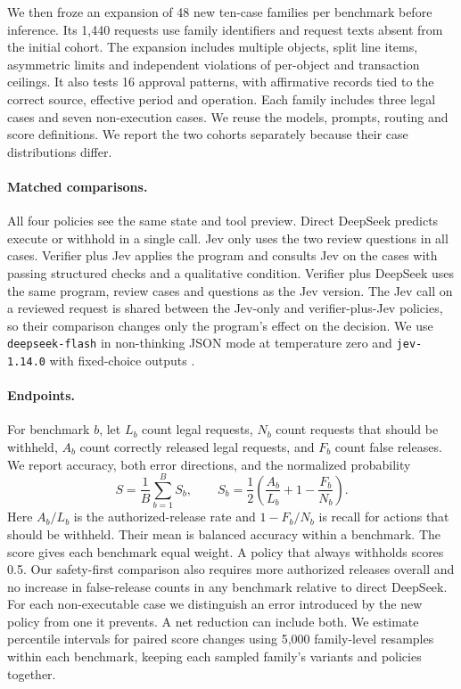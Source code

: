 \documentclass[10pt,letterpaper]{article}
\begin{document}
We then froze an expansion of 48 new ten-case families per benchmark before inference. Its 1,440 requests use family identifiers and request texts absent from the initial cohort. The expansion includes multiple objects, split line items, asymmetric limits and independent violations of per-object and transaction ceilings. It also tests 16 approval patterns, with affirmative records tied to the correct source, effective period and operation. Each family includes three legal cases and seven non-execution cases. We reuse the models, prompts, routing and score definitions. We report the two cohorts separately because their case distributions differ.

\paragraph{Matched comparisons.}
All four policies see the same state and tool preview. Direct DeepSeek predicts execute or withhold in a single call. Jev only uses the two review questions in all cases. Verifier plus Jev applies the program and consults Jev on the cases with passing structured checks and a qualitative condition. Verifier plus DeepSeek uses the same program, review cases and questions as the Jev version. The Jev call on a reviewed request is shared between the Jev-only and verifier-plus-Jev policies, so their comparison changes only the program's effect on the decision. We use \texttt{deepseek-flash} in non-thinking JSON mode at temperature zero and \texttt{jev-1.14.0} with fixed-choice outputs \cite{dsapi,jevapi}.

\paragraph{Endpoints.}
For benchmark \(b\), let \(L_b\) count legal requests, \(N_b\) count requests that should be withheld, \(A_b\) count correctly released legal requests, and \(F_b\) count false releases. We report accuracy, both error directions, and the normalized probability
\[
    S=\frac{1}{B}\sum_{b=1}^{B} S_b,
    \qquad S_b=\frac12\left(\frac{A_b}{L_b}+1-\frac{F_b}{N_b}\right).
\]
Here \(A_b/L_b\) is the authorized-release rate and \(1-F_b/N_b\) is recall for actions that should be withheld. Their mean is balanced accuracy within a benchmark. The score gives each benchmark equal weight. A policy that always withholds scores 0.5. Our safety-first comparison also requires more authorized releases overall and no increase in false-release counts in any benchmark relative to direct DeepSeek. For each non-executable case we distinguish an error introduced by the new policy from one it prevents. A net reduction can include both. We estimate percentile intervals for paired score changes using 5,000 family-level resamples within each benchmark, keeping each sampled family's variants and policies together.
\end{document}
